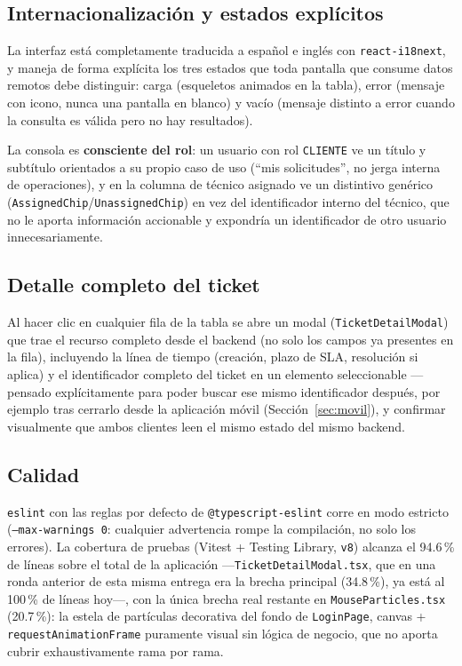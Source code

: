 \subsection{Internacionalización y estados explícitos}

La interfaz está completamente traducida a español e inglés con \texttt{react-i18next}, y
maneja de forma explícita los tres estados que toda pantalla que consume datos remotos debe
distinguir: carga (esqueletos animados en la tabla), error (mensaje con icono, nunca una pantalla
en blanco) y vacío (mensaje distinto a error cuando la consulta es válida pero no hay resultados).

La consola es \textbf{consciente del rol}: un usuario con rol \texttt{CLIENTE} ve un título y
subtítulo orientados a su propio caso de uso (``mis solicitudes'', no jerga interna de
operaciones), y en la columna de técnico asignado ve un distintivo genérico
(\texttt{AssignedChip}/\texttt{UnassignedChip}) en vez del identificador interno del técnico, que
no le aporta información accionable y expondría un identificador de otro usuario innecesariamente.

\subsection{Detalle completo del ticket}

Al hacer clic en cualquier fila de la tabla se abre un modal (\texttt{TicketDetailModal}) que
trae el recurso completo desde el backend (no solo los campos ya presentes en la fila),
incluyendo la línea de tiempo (creación, plazo de SLA, resolución si aplica) y el identificador
completo del ticket en un elemento seleccionable —pensado explícitamente para poder buscar ese
mismo identificador después, por ejemplo tras cerrarlo desde la aplicación móvil
(Sección~\ref{sec:movil}), y confirmar visualmente que ambos clientes leen el mismo estado del
mismo backend.

\subsection{Calidad}

\texttt{eslint} con las reglas por defecto de \texttt{@typescript-eslint} corre en modo estricto
(\texttt{--max-warnings 0}: cualquier advertencia rompe la compilación, no solo los errores). La
cobertura de pruebas (Vitest + Testing Library, \texttt{v8}) alcanza el 94.6\,\% de líneas sobre
el total de la aplicación —\texttt{TicketDetailModal.tsx}, que en una ronda anterior de esta
misma entrega era la brecha principal (34.8\,\%), ya está al 100\,\% de líneas hoy—, con la única
brecha real restante en \texttt{MouseParticles.tsx} (20.7\,\%): la estela de partículas
decorativa del fondo de \texttt{LoginPage}, canvas + \texttt{requestAnimationFrame} puramente
visual sin lógica de negocio, que no aporta cubrir exhaustivamente rama por rama.
